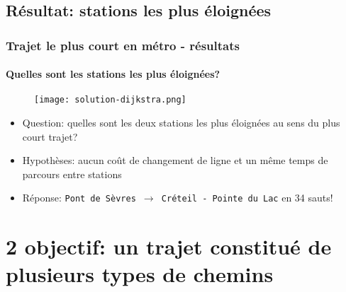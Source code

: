 \documentclass[10pt]{beamer}
\begin{document}
\subsection{Résultat: stations les plus éloignées}

\begin{frame}
\frametitle{Trajet le plus court en métro - résultats}
\framesubtitle{Quelles sont les stations les plus éloignées?}

\begin{figure}
\centering
\texttt{[image: solution-dijkstra.png]}
\end{figure}

\small
\begin{itemize}
\item Question: quelles sont les deux stations les plus éloignées au sens du plus court trajet?
\item Hypothèses: aucun coût de changement de ligne et un même temps de parcours entre stations
\item Réponse: \texttt{Pont de Sèvres $\rightarrow$ Créteil - Pointe du Lac} en 34 sauts!
\end{itemize}

\end{frame}

\section{\textbf{2\ieme{} objectif}: un trajet constitué de plusieurs types de chemins}
\end{document}
